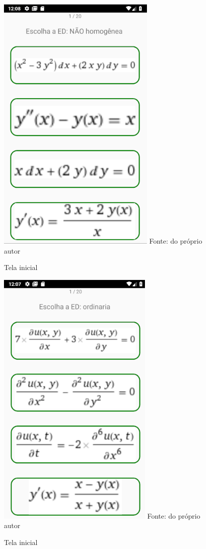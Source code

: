 \begin{figure}[H]
\centering
\caption{Tela inicial}
\includegraphics[scale=0.72]{figuras/ex_ed_n_homog.png}
\small{Fonte: do próprio autor}
\end{figure}

\begin{figure}[H]
\centering
\caption{Tela inicial}
\includegraphics[scale=0.72]{figuras/ex_ed_ordinaria.png}
\small{Fonte: do próprio autor}
\end{figure}

